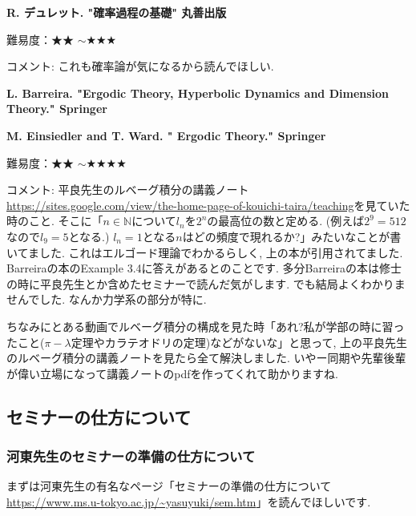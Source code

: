 \textbf{R. デュレット. "確率過程の基礎" 丸善出版}  　\vspace{-6pt} 

難易度：★★ $\sim$★★★\vspace{-6pt} 

コメント: これも確率論が気になるから読んでほしい. 
\vspace{8pt}

\textbf{L. Barreira. "Ergodic Theory, Hyperbolic Dynamics and Dimension Theory." Springer}　\vspace{-6pt} 

\textbf{M. Einsiedler and T. Ward. " Ergodic Theory." Springer }  　\vspace{-6pt} 

難易度：★★ $\sim$★★★★\vspace{-6pt} 

コメント: 平良先生のルベーグ積分の講義ノート\url{https://sites.google.com/view/the-home-page-of-kouichi-taira/teaching}を見ていた時のこと. 
そこに「$n \in \mathbb{N}$について$l_n$を$2^{n}$の最高位の数と定める. (例えば$2^9=512$なので$l_9=5$となる.) $l_n=1$となる$n$はどの頻度で現れるか?」みたいなことが書いてました.
これはエルゴード理論でわかるらしく, 上の本が引用されてました. 
Barreiraの本のExample 3.4に答えがあるとのことです. 
多分Barreiraの本は修士の時に平良先生とか含めたセミナーで読んだ気がします. でも結局よくわかりませんでした. なんか力学系の部分が特に. 

ちなみにとある動画でルベーグ積分の構成を見た時「あれ?私が学部の時に習ったこと($\pi-\lambda$定理やカラテオドリの定理)などがないな」と思って, 上の平良先生のルベーグ積分の講義ノートを見たら全て解決しました. いやー同期や先輩後輩が偉い立場になって講義ノートのpdfを作ってくれて助かりますね. 

\vspace{8pt}


\subsection{セミナーの仕方について}
\label{subsec-seminar}
\subsubsection{河東先生のセミナーの準備の仕方について}
まずは河東先生の有名なページ「セミナーの準備の仕方について \url{https://www.ms.u-tokyo.ac.jp/~yasuyuki/sem.htm}」を読んでほしいです.

